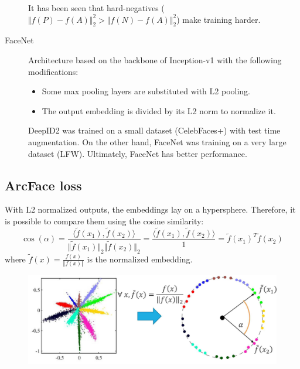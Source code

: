 \begin{description}
        \begin{remark}
            It has been seen that hard-negatives ($\Vert f(P) - f(A) \Vert_2^2 > \Vert f(N) - f(A) \Vert_2^2$) make training harder.
        \end{remark}

    \item[FaceNet] 
        Architecture based on the backbone of Inception-v1 with the following modifications:
        \begin{itemize}
            \item Some max pooling layers are substituted with L2 pooling.
            \item The output embedding is divided by its L2 norm to normalize it.
        \end{itemize}

        \begin{remark}
            DeepID2 was trained on a small dataset (CelebFaces+) with test time augmentation. On the other hand, FaceNet was training on a very large dataset (LFW). Ultimately, FaceNet has better performance.
        \end{remark}
\end{description}


\subsection{ArcFace loss}

\begin{remark}
    With L2 normalized outputs, the embeddings lay on a hypersphere. Therefore, it is possible to compare them using the cosine similarity:
    \[ 
        \cos(\alpha) 
            = \frac{\langle \tilde{f}(x_1), \tilde{f}(x_2) \rangle}{\Vert \tilde{f}(x_1) \Vert_2 \Vert \tilde{f}(x_2) \Vert_2} 
            = \frac{\langle \tilde{f}(x_1), \tilde{f}(x_2) \rangle}{1} 
            = \tilde{f}(x_1)^T \tilde{f}(x_2)
    \]
    where $\tilde{f}(x) = \frac{f(x)}{\Vert f(x) \Vert}$ is the normalized embedding.

    \begin{figure}[H]
        \centering
        \includegraphics[width=0.6\linewidth]{./img/_embedding_l2_norm_effect.jpg}
    \end{figure}
\end{remark}

